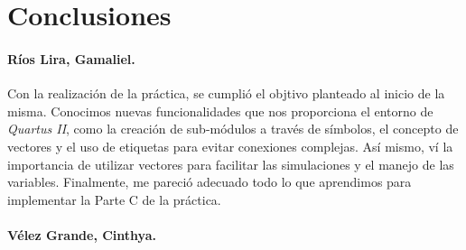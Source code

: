 \documentclass[../main.tex]{subfiles}
\begin{document}
\clearpage
\section{Conclusiones}
\paragraph{Ríos Lira, Gamaliel.} Con la realización de la práctica, se cumplió 
el objtivo planteado al inicio de la misma. Conocimos nuevas funcionalidades 
que nos proporciona el entorno de \textit{Quartus II}, como la creación de 
sub-módulos a través de símbolos, el concepto de vectores y el uso de 
etiquetas para evitar conexiones complejas. Así mismo, ví la importancia de 
utilizar vectores para facilitar las simulaciones y el manejo de las 
variables. Finalmente, me pareció adecuado todo lo que aprendimos para 
implementar la Parte C de la práctica.

\paragraph{Vélez Grande, Cinthya.}
\end{document}
